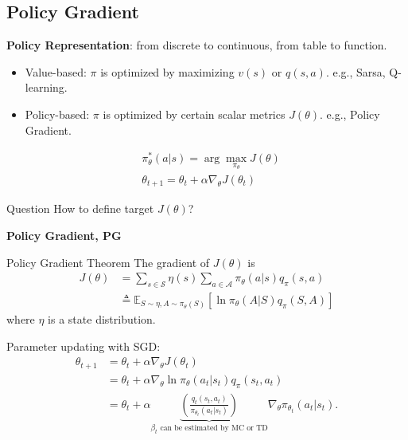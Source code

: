 \subsection{Policy Gradient}
\begin{frame}
\textbf{Policy Representation}: from discrete to continuous, from table to function.
\begin{itemize}
\item Value-based: $\pi$ is optimized by maximizing $v(s)$ or $q(s,a)$.
e.g., Sarsa, Q-learning.
\item Policy-based: $\pi$ is optimized by certain scalar metrics $J(\theta)$.
e.g., Policy Gradient.
\end{itemize}
\begin{align*}
&\pi_{\theta}^*(a|s) = \arg \max_{\pi_\theta} J(\theta) \\
&\theta_{t+1} = \theta_t + \alpha \nabla_\theta J(\theta_t)
\end{align*}
\begin{block}{Question}
How to define target $J(\theta)$?
\end{block}
\end{frame}
\begin{frame}
\textbf{Policy Gradient, PG}
\begin{block}{Policy Gradient Theorem}
The gradient of $J(\theta)$ is
\begin{align*}
J(\theta) &=
\sum_{s\in \mathcal{S}}\eta(s)\sum_{a \in \mathcal{A}}\pi_\theta(a|s)q_\pi(s,a)\\
&\triangleq \mathbb{E}_{S\sim\eta,A\sim\pi_\theta(S)}\left[
\ln \pi_\theta(A|S)q_\pi(S,A)
\right]
\end{align*}
where $\eta$ is a state distribution.
\end{block}
Parameter updating with SGD:
\begin{align*}
\theta_{t+1} &= \theta_t + \alpha \nabla_\theta J(\theta_t) \\
&=\theta_t + \alpha \nabla_{\theta} \ln \pi_\theta(a_t|s_t)q_\pi(s_t,a_t) \\
&=\theta_t + \alpha \underbrace{\left(
\frac{q_t(s_t, a_t)}{\pi_{\theta_t}(a_t|s_t)}
\right)}_{\beta_t \text{ can be estimated by MC or TD}}
\nabla_\theta \pi_{\theta_t}(a_t|s_t).
\end{align*}
\end{frame}
